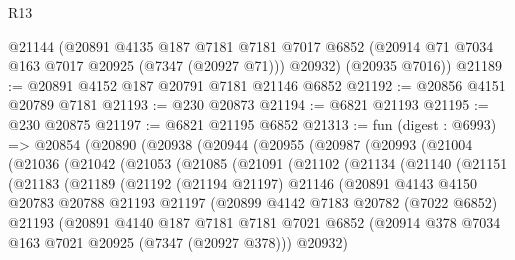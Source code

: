 \begin{lexlean}{R13}
\begin{coremodule}
      @21144
      (@20891
        @4135
        @187
        @7181
        @7181
        @7017
        @6852
        (@20914 @71 @7034 @163 @7017 @20925 (@7347 (@20927 @71)))
        @20932)
      (@20935 @7016))
@21189 := @20891 @4152 @187 @20791 @7181 @21146 @6852
@21192 := @20856 @4151 @20789 @7181
@21193 := @230 @20873
@21194 := @6821 @21193
@21195 := @230 @20875
@21197 := @6821 @21195 @6852
@21313 := fun (digest : @6993) =>
  @20854
    (@20890
      (@20938
        (@20944
          (@20955
            (@20987
              (@20993
                (@21004
                  (@21036
                    (@21042
                      (@21053
                        (@21085
                          (@21091
                            (@21102
                              (@21134
                                (@21140
                                  (@21151
                                    (@21183
                                      (@21189
                                        (@21192
                                          (@21194 @21197)
                                          @21146
                                          (@20891
                                            @4143
                                            @4150
                                            @20783
                                            @20788
                                            @21193
                                            @21197
                                            (@20899
                                              @4142
                                              @7183
                                              @20782
                                              (@7022 @6852)
                                              @21193
                                              (@20891
                                                @4140
                                                @187
                                                @7181
                                                @7181
                                                @7021
                                                @6852
                                                (@20914
                                                  @378
                                                  @7034
                                                  @163
                                                  @7021
                                                  @20925
                                                  (@7347 (@20927 @378)))
                                                @20932)

\end{coremodule}
\end{lexlean}
